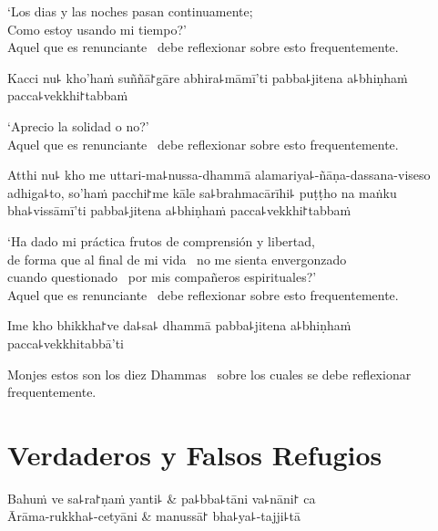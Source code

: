 \begin{english}
  `Los dias y las noches pasan continuamente; \pause\\
  Como estoy usando mi tiempo?' \pause\\
  Aquel que es renunciante \pause\ debe reflexionar sobre esto frequentemente.
\end{english}

Kacci nu꜕ kho'haṁ suññā꜓gāre abhira꜕māmī'ti pabba꜕jitena a꜕bhiṇhaṁ pacca꜕vekkhi꜓tabbaṁ

\begin{english}
  `Aprecio la solidad o no?' \pause\\
  Aquel que es renunciante \pause\ debe reflexionar sobre esto frequentemente.
\end{english}

Atthi nu꜕ kho me uttari-ma꜕nussa-dhammā alamariya꜕-ñāṇa-dassana-viseso adhiga꜕to, so'haṁ pacchi꜓me kāle sa꜕brahmacārīhi꜕ puṭṭho na maṅku bha꜕vissāmī'ti pabba꜕jitena a꜕bhiṇhaṁ pacca꜕vekkhi꜓tabbaṁ

\begin{english}
  `Ha dado mi práctica frutos de comprensión y libertad, \pause\\ de forma que
  al final de mi vida \pause\ no me sienta envergonzado \pause\\
  cuando questionado \pause\ por mis compañeros espirituales?' \pause\\
  Aquel que es renunciante \pause\ debe reflexionar sobre esto frequentemente.
\end{english}

Ime kho bhikkha꜓ve da꜕sa꜕ dhammā pabba꜕jitena a꜕bhiṇhaṁ pacca꜕vekkhitabbā'ti

\begin{english}
  Monjes estos son los diez Dhammas \pause\ sobre los cuales se debe reflexionar frequentemente.
\end{english}

\chapter{Verdaderos y Falsos Refugios}


\begin{leader}
\end{leader}

\begin{twochants}
  Bahuṁ ve sa꜕ra꜓ṇaṁ yanti꜕ & pa꜕bba꜕tāni va꜕nāni꜓ ca \\
  Ārāma-rukkha꜕-cetyāni & manussā꜓ bha꜕ya꜕-tajji꜕tā \\
\end{twochants}

